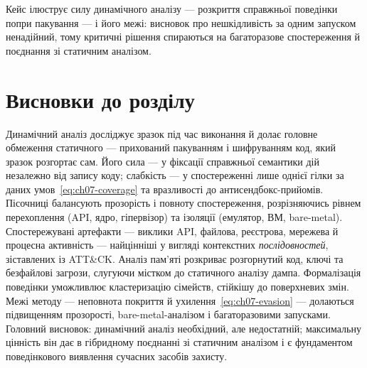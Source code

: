 Кейс ілюструє силу динамічного аналізу --- розкриття справжньої поведінки попри пакування --- і його межі: висновок про нешкідливість за одним запуском ненадійний, тому критичні рішення спираються на багаторазове спостереження й поєднання зі статичним аналізом.

\section*{Висновки до розділу}

Динамічний аналіз досліджує зразок під час виконання й долає головне обмеження статичного --- прихований пакуванням і шифруванням код, який зразок розгортає сам. Його сила --- у фіксації справжньої семантики дій незалежно від запису коду; слабкість --- у спостереженні лише однієї гілки за даних умов~\eqref{eq:ch07-coverage} та вразливості до антисендбокс-прийомів. Пісочниці балансують прозорість і повноту спостереження, розрізняючись рівнем перехоплення (API, ядро, гіпервізор) та ізоляції (емулятор, ВМ, bare-metal). Спостережувані артефакти --- виклики API, файлова, реєстрова, мережева й процесна активність --- найцінніші у вигляді контекстних \emph{послідовностей}, зіставлених із ATT\&CK. Аналіз пам'яті розкриває розгорнутий код, ключі та безфайлові загрози, слугуючи містком до статичного аналізу дампа. Формалізація поведінки уможливлює кластеризацію сімейств, стійкішу до поверхневих змін. Межі методу --- неповнота покриття й ухилення~\eqref{eq:ch07-evasion} --- долаються підвищенням прозорості, bare-metal-аналізом і багаторазовими запусками. Головний висновок: динамічний аналіз необхідний, але недостатній; максимальну цінність він дає в гібридному поєднанні зі статичним аналізом і є фундаментом поведінкового виявлення сучасних засобів захисту.

